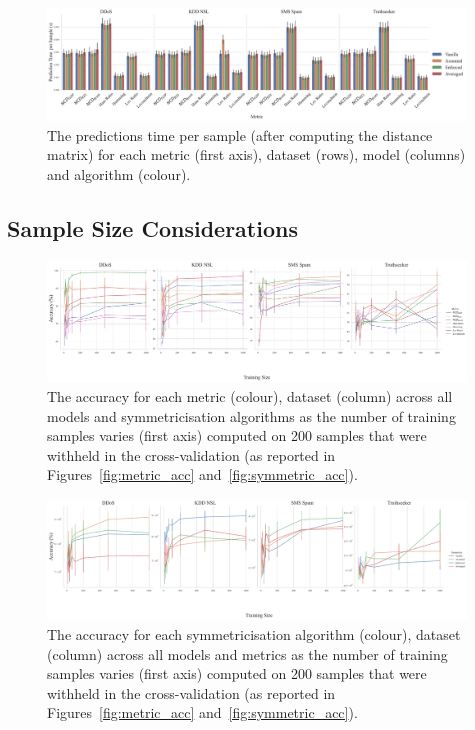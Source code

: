 \documentclass[preprint,12pt]{article}
\begin{document}
\begin{figure}[H]
    \centering
    \includegraphics[width=0.99\textwidth]{images/pred_time_vs_symmetry.pdf}
    \caption{The predictions time per sample (after computing the distance matrix) for each metric (first axis), dataset (rows), model (columns) and algorithm (colour).}
    \label{fig:pred_time}
\end{figure}



\subsection{Sample Size Considerations}
\begin{figure}[h]
    \centering
    \includegraphics[width=0.99\textwidth]{images/accuracy_vs_sample_size_vs_metric.pdf}
    \caption{The accuracy for each metric (colour), dataset (column) across all models and symmetricisation algorithms as the number of training samples varies (first axis) computed on 200 samples that were withheld in the cross-validation (as reported in Figures~\ref{fig:metric_acc} and~\ref{fig:symmetric_acc}).}
    \label{fig:sample_size}
\end{figure}

\begin{figure}[h]
    \centering
    \includegraphics[width=0.99\textwidth]{images/accuracy_vs_sample_size_vs_symmetric.pdf}
    \caption{The accuracy for each symmetricisation algorithm (colour), dataset (column) across all models and metrics as the number of training samples varies (first axis) computed on 200 samples that were withheld in the cross-validation (as reported in Figures~\ref{fig:metric_acc} and~\ref{fig:symmetric_acc}).}
    \label{fig:sample_size_symmetric}
\end{figure}
\end{document}
